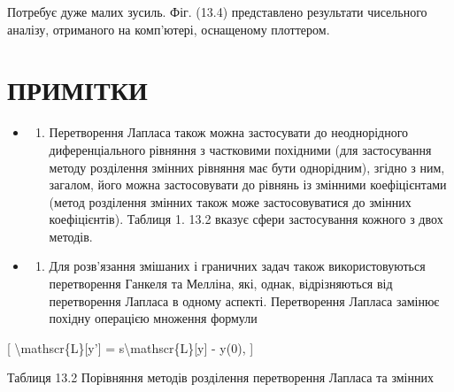 \documentclass[
]{article}
\providecommand{\tightlist}{%
  \setlength{\itemsep}{0pt}\setlength{\parskip}{0pt}}
\begin{document}
Потребує дуже малих зусиль. Фіг. (13.4) представлено результати
чисельного аналізу, отриманого на комп'ютері, оснащеному плоттером.

\section{ПРИМІТКИ}\label{ux43fux440ux438ux43cux456ux442ux43aux438-2}

\begin{itemize}
\tightlist
\item
  \begin{enumerate}
  \def\labelenumi{\arabic{enumi}.}
  \tightlist
  \item
    Перетворення Лапласа також можна застосувати до неоднорідного
    диференціального рівняння з частковими похідними (для застосування
    методу розділення змінних рівняння має бути однорідним), згідно з
    ним, загалом, його можна застосовувати до рівнянь із змінними
    коефіцієнтами (метод розділення змінних також може застосовуватися
    до змінних коефіцієнтів). Таблиця 1. 13.2 вказує сфери застосування
    кожного з двох методів.
  \end{enumerate}
\item
  \begin{enumerate}
  \def\labelenumi{\arabic{enumi}.}
  \setcounter{enumi}{1}
  \tightlist
  \item
    Для розв'язання змішаних і граничних задач також використовуються
    перетворення Ганкеля та Мелліна, які, однак, відрізняються від
    перетворення Лапласа в одному аспекті. Перетворення Лапласа замінює
    похідну операцією множення формули
  \end{enumerate}
\end{itemize}

{[} \textbackslash mathscr\{L\}{[}y'{]} =
s\textbackslash mathscr\{L\}{[}y{]} - y(0), {]}

Таблиця 13.2 Порівняння методів розділення перетворення Лапласа та
змінних
\end{document}
